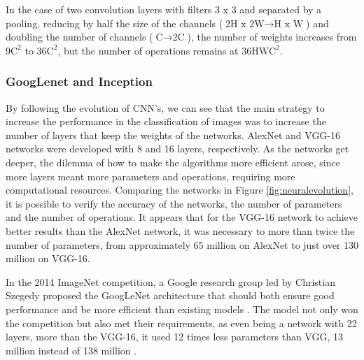 In the case of two convolution layers with filters $3\text{ x }3$ and separated by a pooling, reducing by half the size of the channels ($\text{2H x 2W} \rightarrow \text{H x W}$) and doubling the number of channels ($\text{C} \rightarrow \text{2C}$), the number of weights increases from $9\text{C}^2$ to $36\text{C}^2$, but the number of operations remains at $36\text{HWC}^2$.

\subsubsection{GoogLenet and Inception} \label{inception}

By following the evolution of CNN's, we can see that the main strategy to increase the performance in the classification of images was to increase the number of layers that keep the weights of the networks. AlexNet and VGG-16 networks were developed with 8 and 16 layers, respectively. As the networks get deeper, the dilemma of how to make the algorithms more efficient arose, since more layers meant more parameters and operations, requiring more computational resources. Comparing the networks in Figure \ref{fig:neuralevolution}, it is possible to verify the accuracy of the networks, the number of parameters and the number of operations. It appears that for the VGG-16 network to achieve better results than the AlexNet network, it was necessary to more than twice the number of parameters, from approximately 65 million on AlexNet to just over 130 million on VGG-16.

In the 2014 ImageNet competition, a Google research group led by Christian Szegedy proposed the GoogLeNet architecture that should both ensure good performance and be more efficient than existing models \cite{geron2019}. The model not only won the competition but also met their requirements, as even being a network with 22 layers, more than the VGG-16, it used 12 times less parameters than VGG, 13 million instead of 138 million \cite{elgendy2020}.

